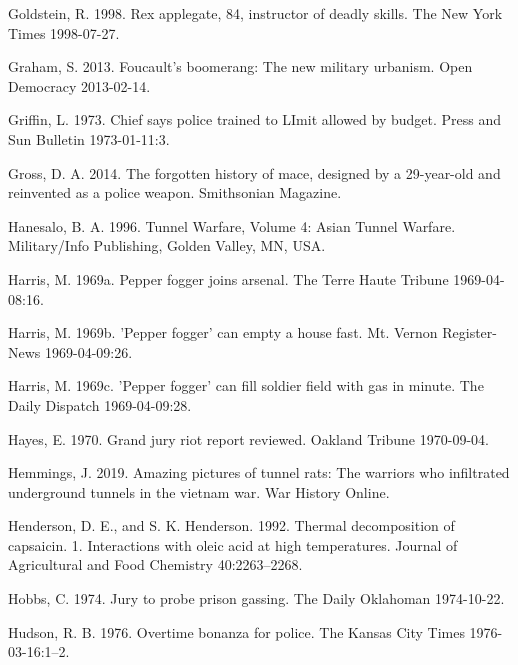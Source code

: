 \documentclass[
  11pt,
]{krantz}
\newlength{\cslhangindent}
\newlength{\cslentryspacingunit} %
\newenvironment{CSLReferences}[2] %
 {%
  \setlength{\parindent}{0pt}
  \ifodd #1
  \let\oldpar\par
  \def\par{\hangindent=\cslhangindent\oldpar}
  \fi
  \setlength{\parskip}{#2\cslentryspacingunit}
 }%
 {}
\begin{document}
\begin{CSLReferences}{1}{0}
\leavevmode{}%
Goldstein, R. 1998. Rex applegate, 84, instructor of deadly skills. The New York Times 1998-07-27.

\leavevmode{}%
Graham, S. 2013. Foucault's boomerang: The new military urbanism. Open Democracy 2013-02-14.

\leavevmode{}%
Griffin, L. 1973. Chief says police trained to LImit allowed by budget. Press and Sun Bulletin 1973-01-11:3.

\leavevmode{}%
Gross, D. A. 2014. The forgotten history of mace, designed by a 29-year-old and reinvented as a police weapon. Smithsonian Magazine.

\leavevmode{}%
Hanesalo, B. A. 1996. {Tunnel Warfare, Volume 4: Asian Tunnel Warfare}. Military/Info Publishing, Golden Valley, MN, USA.

\leavevmode{}%
Harris, M. 1969a. Pepper fogger joins arsenal. The Terre Haute Tribune 1969-04-08:16.

\leavevmode{}%
Harris, M. 1969b. 'Pepper fogger' can empty a house fast. Mt. Vernon Register-News 1969-04-09:26.

\leavevmode{}%
Harris, M. 1969c. 'Pepper fogger' can fill soldier field with gas in minute. The Daily Dispatch 1969-04-09:28.

\leavevmode{}%
Hayes, E. 1970. Grand jury riot report reviewed. Oakland Tribune 1970-09-04.

\leavevmode{}%
Hemmings, J. 2019. Amazing pictures of tunnel rats: The warriors who infiltrated underground tunnels in the vietnam war. War History Online.

\leavevmode{}%
Henderson, D. E., and S. K. Henderson. 1992. Thermal decomposition of capsaicin. 1. Interactions with oleic acid at high temperatures. Journal of Agricultural and Food Chemistry 40:2263--2268.

\leavevmode{}%
Hobbs, C. 1974. Jury to probe prison gassing. The Daily Oklahoman 1974-10-22.

\leavevmode{}%
Hudson, R. B. 1976. Overtime bonanza for police. The Kansas City Times 1976-03-16:1--2.


\end{CSLReferences}
\end{document}
